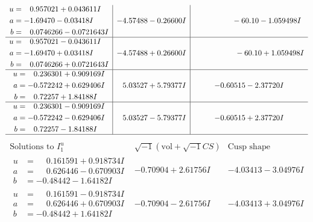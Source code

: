 \documentclass[1p]{elsarticle_modified}
\theoremstyle{definition}
\newcommand{\I}{\sqrt{-1}}
\begin{document}
$$\begin{array}{c|c|c}
\begin{aligned}
u &= \phantom{-}0.957021 + 0.043611 I \\
a &= -1.69470 - 0.03418 I \\
b &= \phantom{-}0.0746266 - 0.0721643 I\end{aligned}
 & -4.57488 - 0.26600 I & \phantom{-0.000000 }      -6
0. 10   - 1.059498 I \\ \hline\begin{aligned}
u &= \phantom{-}0.957021 - 0.043611 I \\
a &= -1.69470 + 0.03418 I \\
b &= \phantom{-}0.0746266 + 0.0721643 I\end{aligned}
 & -4.57488 + 0.26600 I & \phantom{-0.000000 -}     -6
0. 10   + 1.059498 I \\ \hline\begin{aligned}
u &= \phantom{-}0.236301 + 0.909169 I \\
a &= -0.572242 + 0.629406 I \\
b &= \phantom{-}0.72257 + 1.84188 I\end{aligned}
 & \phantom{-}5.03527 + 5.79377 I & -0.60515 - 2.37720 I \\ \hline\begin{aligned}
u &= \phantom{-}0.236301 - 0.909169 I \\
a &= -0.572242 - 0.629406 I \\
b &= \phantom{-}0.72257 - 1.84188 I\end{aligned}
 & \phantom{-}5.03527 - 5.79377 I & -0.60515 + 2.37720 I\\
 \hline 
 \end{array}$$\newpage$$\begin{array}{c|c|c}  
\text{Solutions to }I^u_{1}& \I (\text{vol} + \sqrt{-1}CS) & \text{Cusp shape}\\
 \hline 
\begin{aligned}
u &= \phantom{-}0.161591 + 0.918734 I \\
a &= \phantom{-}0.626446 - 0.670903 I \\
b &= -0.48442 - 1.64182 I\end{aligned}
 & -0.70904 + 2.61756 I & -4.03413 - 3.04976 I \\ \hline\begin{aligned}
u &= \phantom{-}0.161591 - 0.918734 I \\
a &= \phantom{-}0.626446 + 0.670903 I \\
b &= -0.48442 + 1.64182 I\end{aligned}
 & -0.70904 - 2.61756 I & -4.03413 + 3.04976 I \\ \hline\begin{aligned}

\end{aligned}
\end{array}$$
\end{document}
